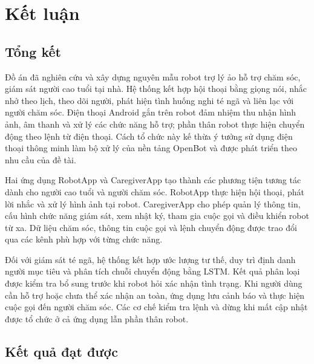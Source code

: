 \section{Kết luận}

\subsection{Tổng kết}

Đồ án đã nghiên cứu và xây dựng nguyên mẫu robot trợ lý ảo hỗ trợ chăm sóc, giám sát người cao tuổi tại nhà. Hệ thống kết hợp hội thoại bằng giọng nói, nhắc nhở theo lịch, theo dõi người, phát hiện tình huống nghi té ngã và liên lạc với người chăm sóc. Điện thoại Android gắn trên robot đảm nhiệm thu nhận hình ảnh, âm thanh và xử lý các chức năng hỗ trợ; phần thân robot thực hiện chuyển động theo lệnh từ điện thoại. Cách tổ chức này kế thừa ý tưởng sử dụng điện thoại thông minh làm bộ xử lý của nền tảng OpenBot và được phát triển theo nhu cầu của đề tài.

Hai ứng dụng RobotApp và CaregiverApp tạo thành các phương tiện tương tác dành cho người cao tuổi và người chăm sóc. RobotApp thực hiện hội thoại, phát lời nhắc và xử lý hình ảnh tại robot. CaregiverApp cho phép quản lý thông tin, cấu hình chức năng giám sát, xem nhật ký, tham gia cuộc gọi và điều khiển robot từ xa. Dữ liệu chăm sóc, thông tin cuộc gọi và lệnh chuyển động được trao đổi qua các kênh phù hợp với từng chức năng.

Đối với giám sát té ngã, hệ thống kết hợp ước lượng tư thế, duy trì định danh người mục tiêu và phân tích chuỗi chuyển động bằng LSTM. Kết quả phân loại được kiểm tra bổ sung trước khi robot hỏi xác nhận tình trạng. Khi người dùng cần hỗ trợ hoặc chưa thể xác nhận an toàn, ứng dụng lưu cảnh báo và thực hiện cuộc gọi đến người chăm sóc. Các cơ chế kiểm tra lệnh và dừng khi mất cập nhật được tổ chức ở cả ứng dụng lẫn phần thân robot.

\subsection{Kết quả đạt được}

